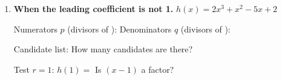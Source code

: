 \documentclass[10pt]{article}
\begin{document}
\begin{tcolorbox}[colback=white, colframe=black!40, title=\textbf{Tier R --- Remediate},
    fonttitle=\bfseries, arc=1.5mm, left=3mm, right=3mm, top=2mm, bottom=2mm, breakable]
\begin{enumerate}[leftmargin=1.7em, itemsep=9pt]
    \vspace{2pt}
    Depressed polynomial:  \qquad $g(x) = $ 

    \vspace{2pt}
    Zeros: 

    \vspace{2pt}
    In Lesson 3.2 you could have factored this one by \emph{grouping}. Show that route in one line:

  \item \textbf{When the leading coefficient is not 1.} $h(x) = 2x^3 + x^2 - 5x + 2$

    \vspace{2pt}
    Numerators $p$ (divisors of ):  \qquad
    Denominators $q$ (divisors of ): 

    \vspace{2pt}
    Candidate list:  \; How many candidates are there? 

    \vspace{2pt}
    Test $r = 1$: $h(1) = $  \; Is $(x-1)$ a factor? 
\end{enumerate}
\end{tcolorbox}
\end{document}
